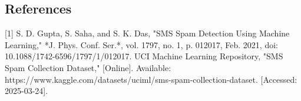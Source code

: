 \documentclass{article}
\begin{document}
\noindent


\subsection*{References}

[1] S. D. Gupta, S. Saha, and S. K. Das, "SMS Spam Detection Using Machine Learning," *J. Phys. Conf. Ser.*, vol. 1797, no. 1, p. 012017, Feb. 2021, doi: 10.1088/1742-6596/1797/1/012017.
\newline
\newline
[2] UCI Machine Learning Repository, "SMS Spam Collection Dataset," [Online]. Available: https://www.kaggle.com/datasets/uciml/sms-spam-collection-dataset. [Accessed: 2025-03-24].




\newpage
\end{document}
